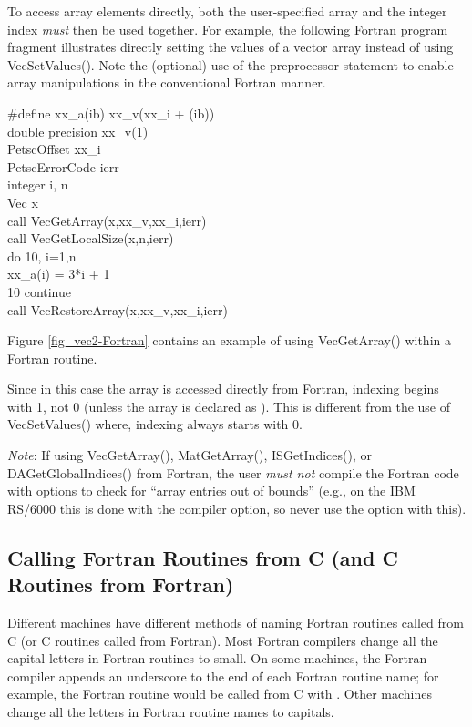 To access array elements directly, both the user-specified array and
the integer index {\em must} then be used together.  
For example, the following Fortran program fragment illustrates
directly setting the values of a vector array instead of using VecSetValues().  Note the (optional) use of the preprocessor 
 statement to enable array manipulations in the conventional
Fortran manner.
\begin{tabbing}
   \#define xx\_a(ib)  xx\_v(xx\_i + (ib))\\

    double precision xx\_v(1)\\
    PetscOffset      xx\_i\\
    PetscErrorCode ierr\\
    integer          i, n\\
    Vec              x\\
    call VecGetArray(x,xx\_v,xx\_i,ierr)\\
    call VecGetLocalSize(x,n,ierr)\\
    do 10, i=1,n\\
       xx\_a(i) = 3*i + 1\\
 10 continue\\
    call VecRestoreArray(x,xx\_v,xx\_i,ierr)
\end{tabbing}
Figure \ref{fig_vec2-Fortran} contains an example of using VecGetArray()
within a Fortran routine.

Since in this case the array is accessed directly from Fortran,
indexing begins with 1, not 0 (unless the array is declared as ).
This is different from the use of VecSetValues()
where, indexing always starts with 0.

{\em Note}: If using VecGetArray(), MatGetArray(), ISGetIndices(),
or DAGetGlobalIndices()
from Fortran, the user {\em must not} compile the Fortran code with options 
to check for ``array entries out of bounds'' (e.g., on the IBM RS/6000 this 
is done with the  compiler option, so never use the  option with this).

\subsection{Calling Fortran Routines from C (and C Routines from Fortran)}


Different machines have
different methods of naming Fortran routines called from C 
(or C routines called from Fortran). Most Fortran compilers change
all the capital letters in Fortran routines to small. On some machines, the 
Fortran compiler appends an underscore to the end of each Fortran 
routine name; for example, the Fortran routine 
would be called from C with .  Other machines
change all the letters in Fortran routine names to capitals. 


